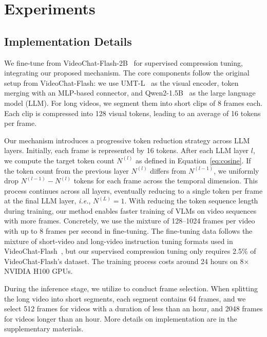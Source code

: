 \vspace{-3pt}

\section{Experiments}

\vspace{-3pt}


\subsection{Implementation Details}
We fine-tune \name from VideoChat-Flash-2B~\cite{li2024videochat} for supervised compression tuning, integrating our proposed \drop mechanism. The core components follow the original setup from VideoChat-Flash: we use UMT-L~\cite{liu2022umt} as the visual encoder, token merging with an MLP-based connector, and Qwen2-1.5B~\cite{yang2024qwen2} as the large language model (LLM). For long videos, we segment them into short clips of 8 frames each. Each clip is compressed into 128 visual tokens, leading to an average of 16 tokens per frame.

Our \drop mechanism introduces a progressive token reduction strategy across LLM layers. Initially, each frame is represented by 16 tokens. After each LLM layer $l$, we compute the target token count $N^{(l)}$ as defined in Equation~\ref{eq:cosine}. If the token count from the previous layer $N^{(l)}$ differs from $N^{(l-1)}$, we uniformly drop $N^{(l-1)} -N^{(l)}$ tokens for each frame across the temporal dimension. This process continues across all layers, eventually reducing to a single token per frame at the final LLM layer, \emph{i.e.}, $N^{(L)} = 1$. With \drop reducing the token sequence length during training, our method enables faster training of VLMs on video sequences with more frames. Concretely, we use the mixture of 128–1024 frames per video with up to 8 frames per second in fine-tuning. The fine-tuning data follows the mixture of short-video and long-video instruction tuning formats used in VideoChat-Flash~\cite{li2024videochat}, but our supervised compression tuning only requires 2.5\% of VideoChat-Flash's dataset. The training process costs around 24 hours on 8$\times$NVIDIA H100 GPUs.

During the inference stage, we utilize \segment to conduct frame selection. When splitting the long video into short segments, each segment contains 64 frames, and we select 512 frames for videos with a duration of less than an hour, and 2048 frames for videos longer than an hour. More details on implementation are in the supplementary materials.

